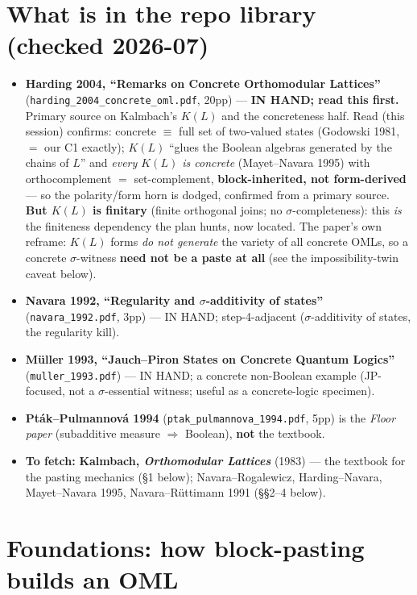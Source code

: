 \documentclass[11pt]{article}
\begin{document}
\section*{What is in the repo library (checked 2026-07)}

\begin{itemize}[leftmargin=*]
  \item \textbf{Harding 2004, ``Remarks on Concrete Orthomodular Lattices''}
    (\texttt{harding\_2004\_concrete\_oml.pdf}, 20pp) --- \textbf{IN HAND; read this
    first.} Primary source on Kalmbach's $K(L)$ and the concreteness half. Read (this
    session) confirms: concrete $\equiv$ full set of two-valued states (Godowski 1981,
    $=$ our C1 exactly); $K(L)$ ``glues the Boolean algebras generated by the chains of
    $L$'' and \emph{every $K(L)$ is concrete} (Mayet--Navara 1995) with orthocomplement
    $=$ set-complement, \textbf{block-inherited, not form-derived} --- so the
    polarity/form horn is dodged, confirmed from a primary source. \textbf{But $K(L)$ is
    finitary} (finite orthogonal joins; no $\sigma$-completeness): this \emph{is} the
    finiteness dependency the plan hunts, now located. The paper's own reframe: $K(L)$
    forms \emph{do not generate} the variety of all concrete OMLs, so a concrete
    $\sigma$-witness \textbf{need not be a paste at all} (see the impossibility-twin
    caveat below).
  \item \textbf{Navara 1992, ``Regularity and $\sigma$-additivity of states''}
    (\texttt{navara\_1992.pdf}, 3pp) --- IN HAND; step-4-adjacent ($\sigma$-additivity of
    states, the regularity kill).
  \item \textbf{M\"uller 1993, ``Jauch--Piron States on Concrete Quantum Logics''}
    (\texttt{muller\_1993.pdf}) --- IN HAND; a concrete non-Boolean example (JP-focused,
    not a $\sigma$-essential witness; useful as a concrete-logic specimen).
  \item \textbf{Pt\'ak--Pulmannov\'a 1994} (\texttt{ptak\_pulmannova\_1994.pdf}, 5pp) is
    the \emph{Floor paper} (subadditive measure $\Rightarrow$ Boolean), \textbf{not} the
    textbook.
  \item \textbf{To fetch:} \textbf{Kalmbach, \emph{Orthomodular Lattices}} (1983) --- the
    textbook for the pasting mechanics (\S1 below); Navara--Rogalewicz, Harding--Navara,
    Mayet--Navara 1995, Navara--R\"uttimann 1991 (\S\S2--4 below).
\end{itemize}

\section{Foundations: how block-pasting builds an OML}
\end{document}
